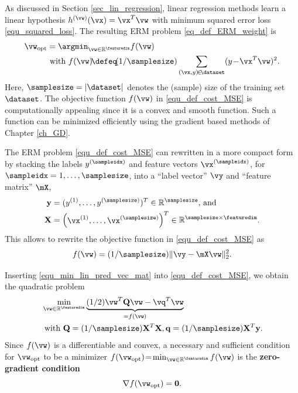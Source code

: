 \documentclass[12pt]{report}
\begin{document}
As discussed in Section \ref{sec_lin_regression}, linear regression methods 
learn a linear hypothesis $h^{(\vw)}(\vx) = \vx^{T} \vw$ with minimum squared 
error loss \eqref{equ_squared_loss}. The resulting ERM problem \eqref{eq_def_ERM_weight} 
is  
\begin{align}
\label{equ_def_cost_MSE}
\vw_{\rm opt} & = \argmin_{\vw \in \mathbb{R}^{\featuredim}} f(\vw) \nonumber \\ 
& \mbox{ with } f(\vw)\!\defeq\!(1/\samplesize) \sum_{(\vx,y)\!\in\!\dataset} (y \!-\! \vx^{T} \vw )^2.
\end{align} 
Here, $\samplesize=|\dataset|$ denotes the (sample) size of the training set $\dataset$. 
The objective function $f(\vw)$ in \eqref{equ_def_cost_MSE} is computationally 
appealing since it is a convex and smooth function. Such a function can be minimized 
efficiently using the gradient based methods of Chapter \ref{ch_GD}. 

The ERM problem \eqref{equ_def_cost_MSE} can rewritten in a more compact form 
by stacking the labels $y^{(\sampleidx)}$ and feature vectors $\vx^{(\sampleidx)}$, for 
$\sampleidx=1,\ldots,\samplesize$, into a ``label vector'' $\vy$ and ``feature matrix'' $\mX$, 
\begin{align}
\label{equ_def_vec_matrix}
\mathbf{y} & = ( y^{(1)},\ldots, y^{(\samplesize)})^{T} \in \mathbb{R}^{\samplesize} \mbox{, and } \nonumber \\ 
\mathbf{X} & = \begin{pmatrix} \vx^{(1)},\ldots,\vx^{(\samplesize)} \end{pmatrix}^{T}\in \mathbb{R}^{\samplesize \times \featuredim}.
\end{align}
This allows to rewrite the objective function in \eqref{equ_def_cost_MSE} as 
\begin{equation}
\label{equ_min_lin_pred_vec_mat}
f(\vw) = (1/\samplesize) \| \vy - \mX\vw \|^{2}_{2}.
\end{equation} 

Inserting \eqref{equ_min_lin_pred_vec_mat} into \eqref{equ_def_cost_MSE}, 
we obtain the quadratic problem 
\begin{align}
\label{equ_quadr_form_linreg}
& \min_{\vw \in \mathbb{R}^{\featuredim}} \underbrace{(1/2) \vw^{T} \mathbf{Q} \vw - \vq^{T}  \vw}_{= f(\vw)} \nonumber \\
& \mbox{ with } \mathbf{Q}= (1/\samplesize) \mathbf{X}^{T} \mathbf{X}, \mathbf{q} =(1/\samplesize) \mathbf{X}^{T} \mathbf{y}. 
\end{align} 
Since $f(\vw)$ is a differentiable and convex, a necessary and sufficient condition for 
$\vw_{\rm opt}$ to be a minimizer $f(\vw_{\rm opt})\!=\!\min_{\vw \in \mathbb{R}^{\featuredim}} f(\vw)$ is the 
{\bf zero-gradient condition} \cite[Sec. 4.2.3]{BoydConvexBook}
\begin{equation}
\label{equ_zero_gradient}
 \nabla f(\vw_{\rm opt}) = \mathbf{0}.
\end{equation} 
\end{document}
